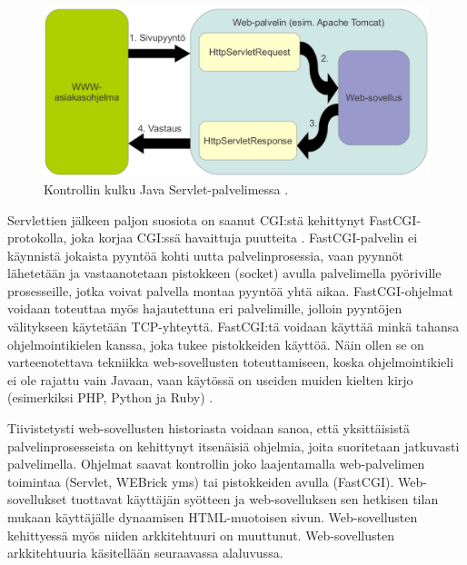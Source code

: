 \begin{figure}[ht]
\centering
\includegraphics[width=\textwidth]{web/servlet.eps}
\caption{Kontrollin kulku Java Servlet-palvelimessa \cite{j2ee}.}%
\label{servlet}
\end{figure}
\pagebreak
Servlettien jälkeen paljon suosiota on saanut CGI:stä kehittynyt FastCGI-protokolla, joka korjaa CGI:ssä havaittuja puutteita \cite{fastcgi}. FastCGI-palvelin ei käynnistä jokaista pyyntöä kohti uutta palvelinprosessia, vaan pyynnöt lähetetään ja vas\-taan\-o\-te\-taan pistokkeen (socket) avulla palvelimella pyöriville prosesseille, jotka voivat palvella montaa pyyntöä yhtä aikaa. FastCGI-ohjelmat voidaan toteuttaa myös hajautettuna eri palvelimille, jolloin pyyntöjen välitykseen käytetään TCP-yhteyttä. FastCGI:tä voidaan käyttää minkä tahansa ohjelmointikielen kanssa, joka tukee pistokkeiden käyttöä. Näin ollen se on varteenotettava tekniikka web-sovellusten toteuttamiseen, koska ohjelmointikieli ei ole rajattu vain Javaan, vaan käytössä on useiden muiden kielten kirjo (esimerkiksi PHP, Python ja Ruby) \cite{fastcgi}.

Tiivistetysti web-sovellusten historiasta voidaan sanoa, että yksittäisistä palvelinprosesseista on kehittynyt itsenäisiä ohjelmia, joita suoritetaan jatkuvasti palvelimella. Ohjelmat saavat kontrollin joko laajentamalla web-pal\-ve\-li\-men toimintaa (Servlet, WEBrick yms) tai pistokkeiden avulla (FastCGI). Web-so\-vel\-luk\-set tuottavat käyttäjän syötteen ja web-sovelluksen sen hetkisen tilan mukaan käyttäjälle dynaamisen HTML-muotoisen sivun. Web-sovellusten kehittyessä myös niiden arkkitehtuuri on muuttunut. Web-sovellusten arkkitehtuuria käsitellään seuraavassa alaluvussa.